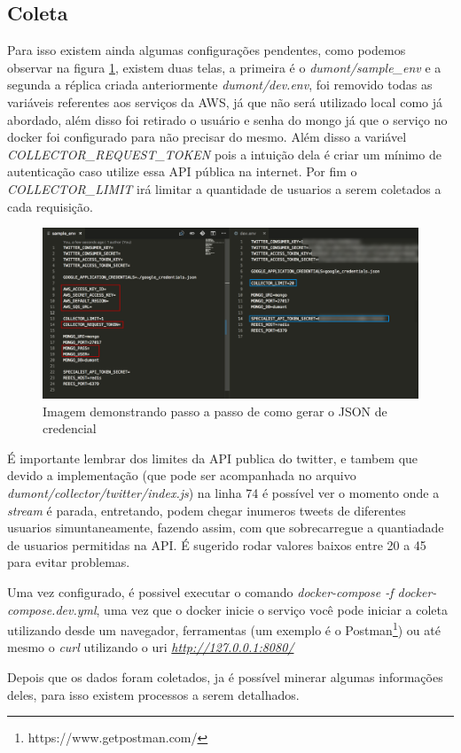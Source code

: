 \subsection{Coleta}
Para isso existem ainda algumas configurações pendentes, como podemos observar na figura \ref{fig:creds}, existem duas telas, a primeira é o \textit{dumont/sample\_env} e a segunda a réplica criada anteriormente \textit{dumont/dev.env}, foi removido todas as variáveis referentes aos serviços da AWS, já que não será utilizado local como já abordado, além disso foi retirado o usuário e senha do mongo já que o serviço no docker foi configurado para não precisar do mesmo. Além disso a variável \textit{COLLECTOR\_REQUEST\_TOKEN} pois a intuição dela é criar um mínimo de autenticação caso utilize essa API pública na internet. Por fim o \textit{COLLECTOR\_LIMIT} irá limitar a quantidade de usuarios a serem coletados a cada requisição.

\begin{figure}
    \centering
    \includegraphics[width=1\textwidth]{imagens/creds.png}
    \caption{Imagem demonstrando passo a passo de como gerar o JSON de credencial}
    \label{fig:creds}
\end{figure}

É importante lembrar dos limites da API publica do twitter, e tambem que devido a implementação (que pode ser acompanhada no arquivo \textit{dumont/collector/twitter/index.js}) na linha 74 é possível ver o momento onde a \textit{stream} é parada, entretando, podem chegar inumeros tweets de diferentes usuarios simuntaneamente, fazendo assim, com que sobrecarregue a quantiadade de usuarios permitidas na API. É sugerido rodar valores baixos entre 20 a 45 para evitar problemas.

Uma vez configurado, é possivel executar o comando \textit{docker-compose -f docker-compose.dev.yml}, uma vez que o docker inicie o serviço você pode iniciar a coleta utilizando desde um navegador, ferramentas (um exemplo é o Postman\footnote{https://www.getpostman.com/}) ou até mesmo o \textit{curl} utilizando o uri \textit{\url{http://127.0.0.1:8080/}}

Depois que os dados foram coletados, ja é possível minerar algumas informações deles, para isso existem processos a serem detalhados.